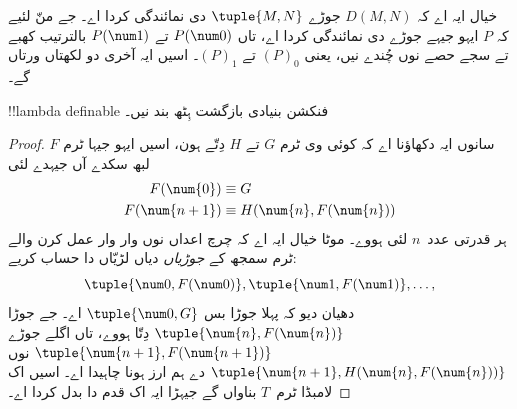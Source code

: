 \documentclass[../../../include/open-logic-section]{subfiles}
\begin{document}
خیال ایہ اے کہ $D(M,N)$ جوڑے $\tuple{M, N}$ دی نمائندگی کردا اے۔
جے منّ لئیے کہ $P$ ایہو جیہے جوڑے دی نمائندگی کردا اے، تاں $P(\num 0)$
تے $P(\num 1)$ بالترتیب کھبے تے سجے حصے نوں چُندے نیں، یعنی
$(P)_0$ تے $(P)_1$۔ اسیں ایہ آخری دو لکھتاں ورتاں گے۔

\begin{lem}
!!{lambda definable} فنکشن بنیادی بازگشت ہِٹھ بند نیں۔
\end{lem}

\begin{proof}
سانوں ایہ دکھاؤنا اے کہ کوئی وی ٹرم $G$ تے $H$ دِتّے ہون، اسیں
ایہو جیہا ٹرم $F$ لبھ سکدے آں جیہدے لئی
\begin{align*}
F(\num{0}) & \equiv G \\
F(\num{n+1}) & \equiv H(\num{n}, F(\num{n}))
\end{align*}
ہر قدرتی عدد~$n$ لئی ہووے۔ موٹا خیال ایہ اے کہ چرچ اعداں نوں
وار وار عمل کرن والے ٹرم سمجھ کے \emph{جوڑیاں} دیاں لڑیّاں دا حساب کریے:
\[
\tuple{\num 0, F(\num 0)}, \tuple{\num 1, F(\num 1)}, \dots,
\]
دھیان دیو کہ پہلا جوڑا بس $\tuple{\num 0, G}$ اے۔ جے جوڑا
$\tuple{\num{n}, F(\num{n})}$ دِتّا ہووے، تاں اگلے جوڑے
$\tuple{\num{n+1}, F(\num{n+1})}$ نوں
$\tuple{\num{n+1}, H(\num{n}, F(\num{n}))}$ دے ہم ارز ہونا چاہیدا اے۔
اسیں اک لامبڈا ٹرم~$T$ بناواں گے جیہڑا ایہ اک قدم دا بدل کردا اے۔


\end{proof}
\end{document}
